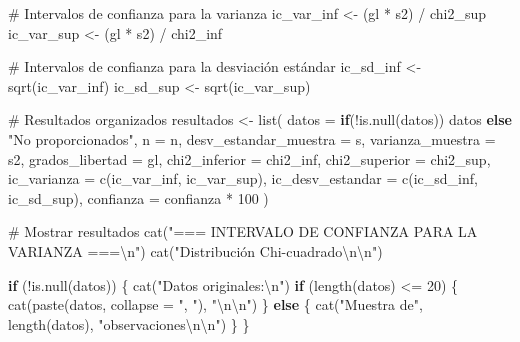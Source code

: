 \documentclass[
  spanish,
  letterpaper,
]{book}
\newenvironment{Shaded}{\begin{snugshade}}{\end{snugshade}}
\newcommand{\AttributeTok}[1]{\textcolor[rgb]{0.40,0.45,0.13}{#1}}
\newcommand{\CommentTok}[1]{\textcolor[rgb]{0.37,0.37,0.37}{#1}}
\newcommand{\ControlFlowTok}[1]{\textcolor[rgb]{0.00,0.23,0.31}{\textbf{#1}}}
\newcommand{\DecValTok}[1]{\textcolor[rgb]{0.68,0.00,0.00}{#1}}
\newcommand{\FunctionTok}[1]{\textcolor[rgb]{0.28,0.35,0.67}{#1}}
\newcommand{\NormalTok}[1]{\textcolor[rgb]{0.00,0.23,0.31}{#1}}
\newcommand{\OtherTok}[1]{\textcolor[rgb]{0.00,0.23,0.31}{#1}}
\newcommand{\SpecialCharTok}[1]{\textcolor[rgb]{0.37,0.37,0.37}{#1}}
\newcommand{\StringTok}[1]{\textcolor[rgb]{0.13,0.47,0.30}{#1}}
\begin{document}
\begin{Shaded}
\begin{Highlighting}[]
  \CommentTok{\# Intervalos de confianza para la varianza}
\NormalTok{  ic\_var\_inf }\OtherTok{\textless{}{-}}\NormalTok{ (gl }\SpecialCharTok{*}\NormalTok{ s2) }\SpecialCharTok{/}\NormalTok{ chi2\_sup}
\NormalTok{  ic\_var\_sup }\OtherTok{\textless{}{-}}\NormalTok{ (gl }\SpecialCharTok{*}\NormalTok{ s2) }\SpecialCharTok{/}\NormalTok{ chi2\_inf}
  
  \CommentTok{\# Intervalos de confianza para la desviación estándar}
\NormalTok{  ic\_sd\_inf }\OtherTok{\textless{}{-}} \FunctionTok{sqrt}\NormalTok{(ic\_var\_inf)}
\NormalTok{  ic\_sd\_sup }\OtherTok{\textless{}{-}} \FunctionTok{sqrt}\NormalTok{(ic\_var\_sup)}
  
  \CommentTok{\# Resultados organizados}
\NormalTok{  resultados }\OtherTok{\textless{}{-}} \FunctionTok{list}\NormalTok{(}
    \AttributeTok{datos =} \ControlFlowTok{if}\NormalTok{(}\SpecialCharTok{!}\FunctionTok{is.null}\NormalTok{(datos)) datos }\ControlFlowTok{else} \StringTok{"No proporcionados"}\NormalTok{,}
    \AttributeTok{n =}\NormalTok{ n,}
    \AttributeTok{desv\_estandar\_muestra =}\NormalTok{ s,}
    \AttributeTok{varianza\_muestra =}\NormalTok{ s2,}
    \AttributeTok{grados\_libertad =}\NormalTok{ gl,}
    \AttributeTok{chi2\_inferior =}\NormalTok{ chi2\_inf,}
    \AttributeTok{chi2\_superior =}\NormalTok{ chi2\_sup,}
    \AttributeTok{ic\_varianza =} \FunctionTok{c}\NormalTok{(ic\_var\_inf, ic\_var\_sup),}
    \AttributeTok{ic\_desv\_estandar =} \FunctionTok{c}\NormalTok{(ic\_sd\_inf, ic\_sd\_sup),}
    \AttributeTok{confianza =}\NormalTok{ confianza }\SpecialCharTok{*} \DecValTok{100}
\NormalTok{  )}
  
  \CommentTok{\# Mostrar resultados}
  \FunctionTok{cat}\NormalTok{(}\StringTok{"=== INTERVALO DE CONFIANZA PARA LA VARIANZA ===}\SpecialCharTok{\textbackslash{}n}\StringTok{"}\NormalTok{)}
  \FunctionTok{cat}\NormalTok{(}\StringTok{"Distribución Chi{-}cuadrado}\SpecialCharTok{\textbackslash{}n\textbackslash{}n}\StringTok{"}\NormalTok{)}
  
  \ControlFlowTok{if}\NormalTok{ (}\SpecialCharTok{!}\FunctionTok{is.null}\NormalTok{(datos)) \{}
    \FunctionTok{cat}\NormalTok{(}\StringTok{"Datos originales:}\SpecialCharTok{\textbackslash{}n}\StringTok{"}\NormalTok{)}
    \ControlFlowTok{if}\NormalTok{ (}\FunctionTok{length}\NormalTok{(datos) }\SpecialCharTok{\textless{}=} \DecValTok{20}\NormalTok{) \{}
      \FunctionTok{cat}\NormalTok{(}\FunctionTok{paste}\NormalTok{(datos, }\AttributeTok{collapse =} \StringTok{", "}\NormalTok{), }\StringTok{"}\SpecialCharTok{\textbackslash{}n\textbackslash{}n}\StringTok{"}\NormalTok{)}
\NormalTok{    \} }\ControlFlowTok{else}\NormalTok{ \{}
      \FunctionTok{cat}\NormalTok{(}\StringTok{"Muestra de"}\NormalTok{, }\FunctionTok{length}\NormalTok{(datos), }\StringTok{"observaciones}\SpecialCharTok{\textbackslash{}n\textbackslash{}n}\StringTok{"}\NormalTok{)}
\NormalTok{    \}}
\NormalTok{  \}}
  

\end{Highlighting}
\end{Shaded}
\end{document}
